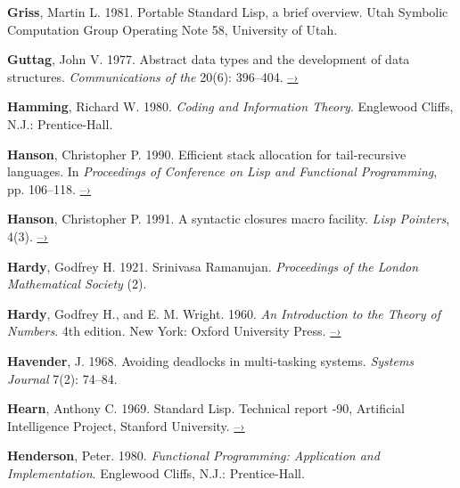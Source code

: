  \label{Griss 1981}
\textbf{Griss}, Martin L.  1981.  Portable Standard Lisp, a brief overview.  Utah
Symbolic Computation Group Operating Note 58, University of Utah.

 \label{Guttag 1977}
\textbf{Guttag}, John V.  1977.  Abstract data types and the development of data
structures.  \textit{Communications of the } 20(6): 396--404.
\href{http://www.unc.edu/~stotts/comp723/guttagADT77.pdf}{–›}

 \label{Hamming 1980}
\textbf{Hamming}, Richard W.  1980.  \textit{Coding and Information Theory}.  Englewood
Cliffs, N.J.: Prentice-Hall.

 \label{Hanson 1990}
\textbf{Hanson}, Christopher P.  1990.  Efficient stack allocation for tail-recur\-sive
languages.  In \textit{Proceedings of  Conference on Lisp and
Functional Programming}, pp. 106--118.
\href{https://groups.csail.mit.edu/mac/ftpdir/users/cph/links.ps.gz}{–›}

 \label{Hanson 1991}
\textbf{Hanson}, Christopher P.  1991.  A syntactic closures macro facility.  \textit{Lisp
Pointers}, 4(3).
\href{http://groups.csail.mit.edu/mac/ftpdir/scheme-reports/synclo.ps}{–›}

 \label{Hardy 1921}
\textbf{Hardy}, Godfrey H.  1921.  Srinivasa Ramanujan.  \textit{Proceedings of the London
Mathematical Society} (2).

 \label{Hardy and Wright 1960}
\textbf{Hardy}, Godfrey H., and E. M. Wright.  1960.  \textit{An Introduction to the
Theory of Numbers}.  4th edition.  New York: Oxford University Press.
\href{https://archive.org/details/AnIntroductionToTheTheoryOfNumbers-4thEd-G.h.HardyE.m.Wright}{–›}

 \label{Havender (1968)}
\textbf{Havender}, J. 1968. Avoiding deadlocks in multi-tasking systems. \textit{
Systems Journal} 7(2): 74--84.

 \label{Hearn 1969}
\textbf{Hearn}, Anthony C.  1969.  Standard Lisp.  Technical report -90,
Artificial Intelligence Project, Stanford University.
\href{http://www.softwarepreservation.org/projects/LISP/stanford/Hearn-StandardLisp-AIM-90.pdf}{–›}

 \label{Henderson 1980}
\textbf{Henderson}, Peter. 1980.  \textit{Functional Programming: Application and
Implementation}. Englewood Cliffs, N.J.: Prentice-Hall.

